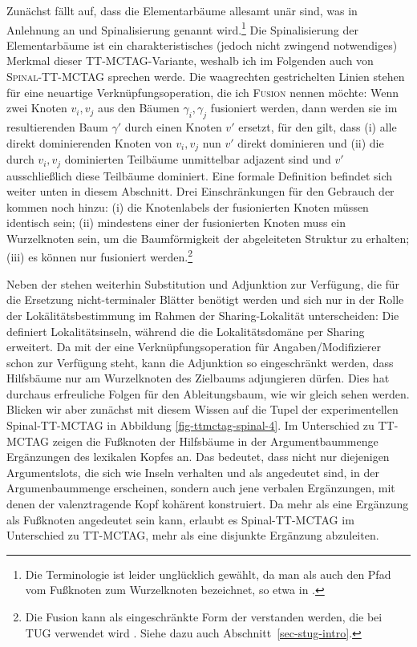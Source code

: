 Zunächst fällt auf, dass die Elementarbäume allesamt unär sind, was in Anlehnung an \cite{Shen:06} und \cite{Shen:etal:08} Spinalisierung genannt wird.\footnote{Die Terminologie ist leider unglücklich gewählt, da man als  auch den Pfad vom Fu\ss knoten zum Wurzelknoten bezeichnet, so etwa in \cite{Schabes:Waters:95}.} Die Spinalisierung der Elementarbäume ist ein charakteristisches (jedoch nicht zwingend notwendiges) Merkmal dieser TT-MCTAG-Variante, weshalb ich im Folgenden auch von \textsc{Spinal-TT-MCTAG} sprechen werde. Die waagrechten gestrichelten Linien stehen für eine neuartige Verknüpfungsoperation, die ich \textsc{Fusion} nennen möchte: Wenn zwei Knoten $v_i,v_j$ aus den Bäumen $\gamma_i,\gamma_j$ fusioniert werden, dann werden sie im resultierenden Baum $\gamma'$ durch einen Knoten $v'$ ersetzt, für den gilt, dass (i) alle direkt dominierenden Knoten von $v_i, v_j$ nun $v'$ direkt dominieren und (ii) die durch $v_i,v_j$ dominierten Teilbäume unmittelbar adjazent sind und $v'$ ausschlie\ss lich diese Teilbäume dominiert.   
Eine formale Definition befindet sich weiter unten in diesem Abschnitt. Drei Einschränkungen für den Gebrauch der  kommen noch hinzu: (i) die Knotenlabels der fusionierten Knoten müssen identisch sein; (ii) mindestens einer der fusionierten Knoten muss ein Wurzelknoten sein, um die Baumförmigkeit der abgeleiteten Struktur zu erhalten; (iii) es können nur  fusioniert werden.\footnote{Die Fusion kann als eingeschränkte Form der  verstanden werden, die bei TUG verwendet wird \citep{Popowich:89,Gerdes:04}. Siehe dazu auch Abschnitt~\ref{sec-stug-intro}.}

Neben der  stehen weiterhin Substitution und Adjunktion zur Verfügung, die für die Ersetzung nicht-terminaler Blätter benötigt werden und sich nur in der Rolle der Lokälitätsbestimmung im Rahmen der Sharing-Lokalität unterscheiden: Die  definiert Lokalitätsinseln, während die  die Lokalitätsdomäne per Sharing erweitert. Da mit der  eine Verknüpfungsoperation für Angaben/Modifizierer schon zur Verfügung steht, kann die Adjunktion so eingeschränkt werden, dass Hilfsbäume nur am Wurzelknoten des Zielbaums adjungieren dürfen. Dies hat durchaus erfreuliche Folgen für den Ableitungsbaum, wie wir gleich sehen werden. Blicken wir aber zunächst mit diesem Wissen auf die Tupel der experimentellen Spinal-TT-MCTAG in Abbildung \ref{fig-ttmctag-spinal-4}. 
Im Unterschied zu TT-MCTAG zeigen die Fu\ss knoten der Hilfsbäume in der Argumentbaummenge Ergänzungen des lexikalen Kopfes an. Das bedeutet, dass nicht nur diejenigen Argumentslots, die sich wie Inseln verhalten und als  angedeutet sind, in der Argumenbaummenge erscheinen,  sondern auch jene verbalen Ergänzungen, mit denen der valenztragende Kopf kohärent konstruiert. Da mehr als eine Ergänzung als Fu\ss knoten angedeutet sein kann, erlaubt es Spinal-TT-MCTAG im Unterschied zu TT-MCTAG, mehr als eine disjunkte Ergänzung abzuleiten.

